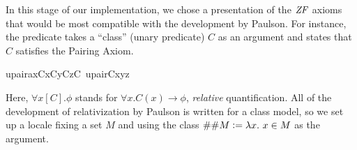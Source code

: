 In this stage of our implementation, we chose a presentation of the
$\mathit{ZF}$ axioms that would be most
compatible with the development by Paulson. For
instance, the predicate
takes a ``class'' (unary predicate) $C$ as an argument and states that
$C$ satisfies the Pairing Axiom.
\begin{isabelle}
upair{\isacharunderscore}ax{\isacharparenleft}C{\isacharparenright}{\isacharequal}{\isacharequal}{\isasymforall}x{\isacharbrackleft}C{\isacharbrackright}{\isachardot}{\isasymforall}y{\isacharbrackleft}C{\isacharbrackright}{\isachardot}{\isasymexists}z{\isacharbrackleft}C{\isacharbrackright}{\isachardot}\ upair{\isacharparenleft}C{\isacharcomma}x{\isacharcomma}y{\isacharcomma}z{\isacharparenright}
\end{isabelle}
Here, $\forall x[C]. \phi$ stands for
$\forall x. C(x) \longrightarrow \phi$, \emph{relative}
quantification. All of the development of relativization by Paulson is
written for a class model, so we set up a locale fixing a set $M$
and using the class $\#\#M\defi \lambda x. \ x\in M$ as the argument. 
